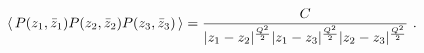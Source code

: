 \begin{equation}
\label{3_puncture}
 \left\langle \, P(z_1,\bar z_1)P(z_2,\bar
z_2)P(z_3,\bar z_3)\,\right\rangle = {C\over |z_1
-z_2|^{Q^2\over 2}|z_1 -z_3|^{Q^2\over 2}|z_2 -z_3|^{Q^2\over 2} }\ .
\end{equation}

